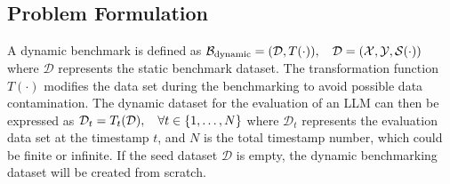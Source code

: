 \subsection{Problem Formulation}

A dynamic benchmark is defined as  
$
\small
\mathcal{B}_{\text{dynamic}} = (\mathcal{D}, T(\cdot)), \quad 
\mathcal{D} = (\mathcal{X}, \mathcal{Y}, \mathcal{S}(\cdot))
$
where \( \mathcal{D} \) represents the static benchmark dataset. 
The transformation function \( T(\cdot) \) modifies the data set during the benchmarking to avoid possible data contamination.
The dynamic dataset for the evaluation of an LLM can then be expressed as
$
\small
        \mathcal{D}_t = T_t(\mathcal{D}),  \quad
        \forall t \in \{1, \dots, N\}
$
where \( \mathcal{D}_t \) represents the evaluation data set at the timestamp \( t \), and \( N\) is the total timestamp number, which could be finite or infinite. %
If the seed dataset $\mathcal{D}$ is empty, the dynamic benchmarking dataset will be created from scratch.

